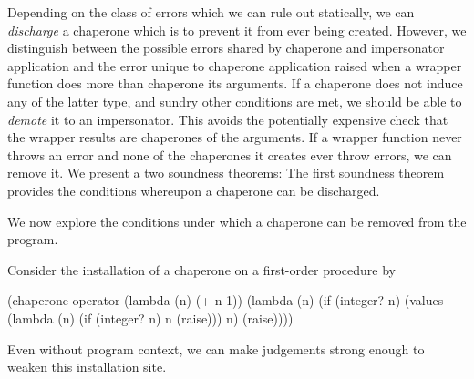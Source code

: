 \documentclass{sigplanconf}
\begin{document}

Depending on the class of errors which we can rule out statically, we can \emph{discharge} a chaperone which is to prevent it from ever being created.
However, we distinguish between the possible errors shared by chaperone and impersonator application and the error unique to chaperone application raised when a wrapper function does more than chaperone its arguments.
If a chaperone does not induce any of the latter type, and sundry other conditions are met, we should be able to \emph{demote} it to an impersonator.
This avoids the potentially expensive check that the wrapper results are chaperones of the arguments.
If a wrapper function never throws an error and none of the chaperones it creates ever throw errors, we can remove it.
We present a two soundness theorems:
The first soundness theorem provides the conditions whereupon a chaperone can be discharged.




We now explore the conditions under which a chaperone can be removed from the program.

Consider the installation of a chaperone on a first-order procedure by
\begin{schemedisplay}
(chaperone-operator
 (lambda (n) (+ n 1))
 (lambda (n)
    (if (integer? n)
        (values (lambda (n)
                  (if (integer? n)
                      n
                      (raise)))
                n)
        (raise))))
\end{schemedisplay}
Even without program context, we can make judgements strong enough to weaken this installation site.
\end{document}
